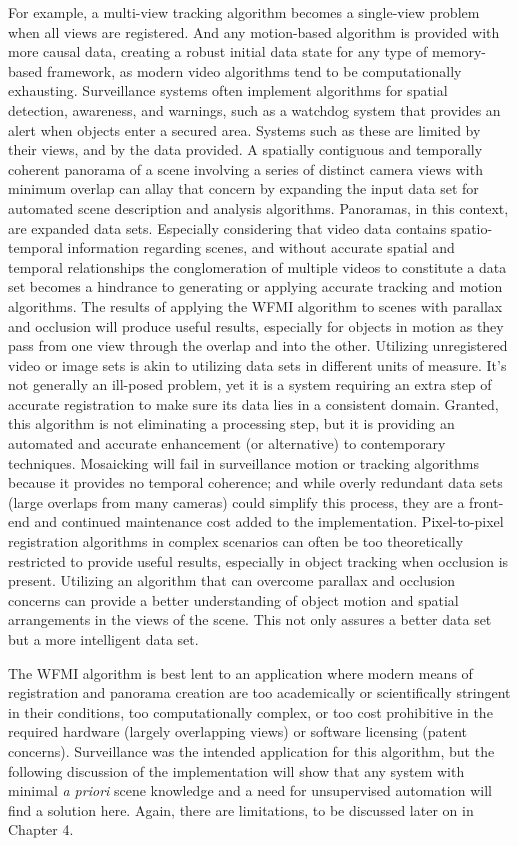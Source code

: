 For example, a multi-view tracking algorithm becomes a single-view problem when all views are registered. And any motion-based algorithm is provided with more causal data, creating a robust initial data state for any type of memory-based framework, as modern video algorithms tend to be computationally exhausting. Surveillance systems often implement algorithms for spatial detection, awareness, and warnings, such as a watchdog system that provides an alert when objects enter a secured area. Systems such as these are limited by their views, and by the data provided. A spatially contiguous and temporally coherent panorama of a scene involving a series of distinct camera views with minimum overlap can allay that concern by expanding the input data set for automated scene description and analysis algorithms. Panoramas, in this context, are expanded data sets. Especially considering that video data contains spatio-temporal information regarding scenes, and without accurate spatial and temporal relationships the conglomeration of multiple videos to constitute a data set becomes a hindrance to generating or applying accurate tracking and motion algorithms. The results of applying the WFMI algorithm to scenes with parallax and occlusion will produce useful results, especially for objects in motion as they pass from one view through the overlap and into the other. Utilizing unregistered video or image sets is akin to utilizing data sets in different units of measure. It's not generally an ill-posed problem, yet it is a system requiring an extra step of accurate registration to make sure its data lies in a consistent domain. Granted, this algorithm is not eliminating a processing step, but it is providing an automated and accurate enhancement (or alternative) to contemporary techniques. Mosaicking will fail in surveillance motion or tracking algorithms because it provides no temporal coherence; and while overly redundant data sets (large overlaps from many cameras) could simplify this process, they are a front-end and continued maintenance cost added to the implementation. Pixel-to-pixel registration algorithms in complex scenarios can often be too theoretically restricted to provide useful results, especially in object tracking when occlusion is present. Utilizing an algorithm that can overcome parallax and occlusion concerns can provide a better understanding of object motion and spatial arrangements in the views of the scene. This not only assures a better data set but a more intelligent data set.

The WFMI algorithm is best lent to an application where modern means of registration and panorama creation are too academically or scientifically stringent in their conditions, too computationally complex, or too cost prohibitive in the required hardware (largely overlapping views) or software licensing (patent concerns). Surveillance was the intended application for this algorithm, but the following discussion of the implementation will show that any system with minimal \textit{a priori} scene knowledge and a need for unsupervised automation will find a solution here. Again, there are limitations, to be discussed later on in Chapter 4.




